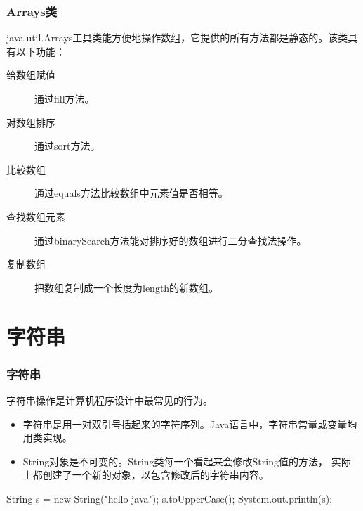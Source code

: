\begin{frame}[fragile]
  \frametitle{Arrays类}

  java.util.Arrays工具类能方便地操作数组，它提供的所有方法都是静态的。该类具有以下功能：

  \begin{description}
  \item[给数组赋值] 通过fill方法。
  \item[对数组排序] 通过sort方法。
  \item[比较数组] 通过equals方法比较数组中元素值是否相等。
  \item[查找数组元素] 通过binarySearch方法能对排序好的数组进行二分查找法操作。
  \item[复制数组] 把数组复制成一个长度为length的新数组。
  \end{description}

\end{frame}

\section{字符串}

\begin{frame}[fragile]
  \frametitle{字符串}
  
  {\hei 字符串操作是计算机程序设计中最常见的行为。}

  \begin{itemize}
  \item 字符串是用一对双引号括起来的字符序列。Java语言中，字符串常量或变量均用类实现。
  \item String对象是不可变的。String类每一个看起来会修改String值的方法，
    实际上都创建了一个新的对象，以包含修改后的字符串内容。
  \end{itemize}

  \begin{javaCode}
    String s = new String("hello java");
    s.toUpperCase();
    System.out.println(s);
  \end{javaCode}

\end{frame}



